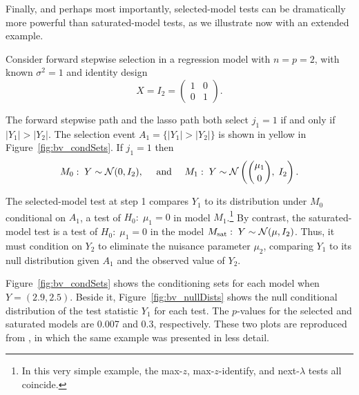 \documentclass{article}
\begin{document}
Finally, and perhaps most importantly, selected-model tests can be dramatically more powerful than saturated-model tests, as we illustrate now with an extended example.

\begin{example}\label{ex:bivariate}
  Consider forward stepwise selection in a regression model with $n=p=2$, with known $\sigma^2=1$ and identity design 
\[
X = I_2=\begin{pmatrix} 1 & 0 \\ 0 & 1\end{pmatrix}.
\] 

The forward stepwise path and the lasso path both select $j_1=1$ if and only if $|Y_1|>|Y_2|$. The selection event $A_1=\{|Y_1| > |Y_2|\}$ is shown in yellow in Figure~\ref{fig:bv_condSets}. If $j_1=1$ then
\[
M_0:\; Y\sim \mathcal{N}(0,I_2), \quad \text{ and } \quad
M_1:\; Y \sim \mathcal{N}\left(\binom{\mu_1}{0}, \; I_2\right).
\]

The selected-model test at step 1 compares $Y_1$ to its distribution under $M_0$ conditional on $A_1$, a test of $H_0:\;\mu_1=0$ in model $M_1$.\footnote{In this very simple example, the max-$z$, max-$z$-identify, and next-$\lambda$ tests all coincide.} By contrast, the saturated-model test is a test of $H_0:\; \mu_1=0$ in the model $M_{\text{sat}}:\; Y \sim \mathcal{N}(\mu, I_2)$. Thus, it must condition on $Y_2$ to eliminate the nuisance parameter $\mu_2$, comparing $Y_1$ to its null distribution given $A_1$ and the observed value of $Y_2$.

Figure~\ref{fig:bv_condSets} shows the conditioning sets for each model when $Y=(2.9, 2.5)$. Beside it, Figure~\ref{fig:bv_nullDists} shows the null conditional distribution of the test statistic $Y_1$ for each test. The $p$-values for the selected and saturated models are 0.007 and 0.3, respectively. These two plots are reproduced from \citet{fithian2014optimal}, in which the same example was presented in less detail.
\end{example}
\end{document}
